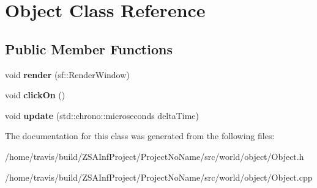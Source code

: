 \hypertarget{classObject}{\section{Object Class Reference}
\label{classObject}
}
\subsection*{Public Member Functions}
\begin{DoxyCompactItemize}
\item 
\hypertarget{classObject_a278a137fafd103884d923fd88c2845cc}{void {\bfseries render} (sf\-::\-Render\-Window)}\label{classObject_a278a137fafd103884d923fd88c2845cc}

\item 
\hypertarget{classObject_ac793c5c56ed16f0309f9eecf2e8e4413}{void {\bfseries click\-On} ()}\label{classObject_ac793c5c56ed16f0309f9eecf2e8e4413}

\item 
\hypertarget{classObject_a81f5c9c6f7806e6b1e13843f0848fdc6}{void {\bfseries update} (std\-::chrono\-::microseconds delta\-Time)}\label{classObject_a81f5c9c6f7806e6b1e13843f0848fdc6}

\end{DoxyCompactItemize}


The documentation for this class was generated from the following files\-:\begin{DoxyCompactItemize}
\item 
/home/travis/build/\-Z\-S\-A\-Inf\-Project/\-Project\-No\-Name/src/world/object/Object.\-h\item 
/home/travis/build/\-Z\-S\-A\-Inf\-Project/\-Project\-No\-Name/src/world/object/Object.\-cpp\end{DoxyCompactItemize}
